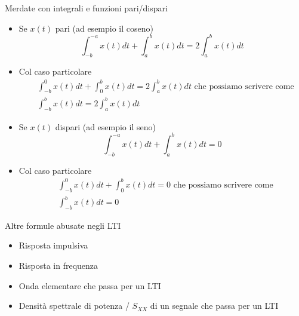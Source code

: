 \documentclass{article}
\begin{document}

Merdate con integrali e funzioni pari/dispari
\begin{itemize}
  \item Se $x(t)$ pari (ad esempio il coseno) \begin{equation*}
    \int_{-b}^{-a} x(t) dt + \int_{a}^{b} x(t) dt = 2\int_{a}^{b} x(t) dt
  \end{equation*}

  \item Col caso particolare \begin{align*}
    &\int_{-b}^{0} x(t) dt + \int_{0}^{b} x(t) dt = 2\int_{a}^{b} x(t) dt \text{ che possiamo scrivere come}\\
    &\int_{-b}^{b} x(t) dt = 2\int_{a}^{b} x(t) dt
  \end{align*}

  \item Se $x(t)$ dispari (ad esempio il seno) \begin{equation*}
    \int_{-b}^{-a} x(t) dt + \int_{a}^{b} x(t) dt = 0
  \end{equation*}

  \item Col caso particolare \begin{align*}
    &\int_{-b}^{0} x(t) dt + \int_{0}^{b} x(t) dt = 0 \text{ che possiamo scrivere come}\\
    &\int_{-b}^{b} x(t) dt = 0
  \end{align*}
\end{itemize}

Altre formule abusate negli LTI
\begin{itemize}
  \item Risposta impulsiva
  \item Risposta in frequenza
  \item Onda elementare che passa per un LTI
  \item Densità spettrale di potenza / $S_{XX}$ di un segnale che passa per un LTI
\end{itemize}
\end{document}
